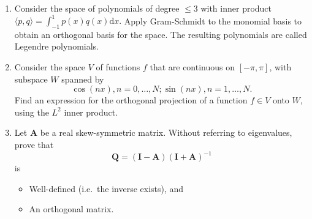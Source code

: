 \documentclass[11pt,fleqn]{article}
\begin{document}
\begin{enumerate}
\item Consider the space of polynomials of degree $\le 3$ with inner product $\langle p,q\rangle = \int_{-1}^1p(x)q(x)\mathrm{d}x.$ Apply Gram-Schmidt to the monomial basis to obtain an orthogonal basis for the space. The resulting polynomials are called Legendre polynomials.
\item Consider the space $V$ of functions $f$ that are continuous on $[-\pi,\pi]$, with subspace $W$ spanned by
\[\cos(nx),n=0,\ldots,N;\sin(nx),n=1,\ldots,N.\]
Find an expression for the orthogonal projection of a function $f\in V$ onto $W$, using the $L^2$ inner product.
\item Let $\mathbf{A}$ be a real skew-symmetric matrix. Without referring to eigenvalues, prove that
\[\mathbf{Q} = (\mathbf{I}-\mathbf{A})(\mathbf{I}+\mathbf{A})^{-1}\]
is
	\begin{itemize}
	\item[(a)] Well-defined (i.e.\ the inverse exists), and
	\item[(b)] An orthogonal matrix.
	\end{itemize}
\end{enumerate}
 
\end{document}
